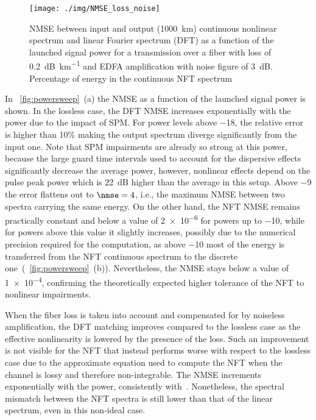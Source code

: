 \begin{figure}[t]
  \centering
   \texttt{[image: ./img/NMSE\_loss\_noise]}
      \caption{ \ac{NMSE} between input and output (\SI{1000}{km}) continuous nonlinear spectrum and linear Fourier spectrum (\ac{DFT}) as a function of the launched signal power
for a transmission over a fiber with loss of \SI{0.2}{\dB\per\km} and \ac{EDFA} amplification with noise figure of \SI{3}{\dB}.  Percentage of energy
in the continuous \ac{NFT} spectrum }
  \label{fig:powersweep_with_noise}
\end{figure}
In \figurename~\ref{fig:powersweep}~(a) the \ac{NMSE} as a function of the launched signal power
is shown. In the lossless case, the \ac{DFT} \ac{NMSE} increases exponentially with the
power due to the impact of \ac{SPM}. For power levels above
\SI{-18}{\dBm}, the relative error is higher than 10\% making the output spectrum
diverge significantly from the input one. Note that \ac{SPM} impairments are already
so strong at this power, because the large guard time intervals used to account
for the dispersive effects significantly decrease the average power, however,
nonlinear effects depend on the pulse peak power which is \SI{22}{\dB} higher than the
average in this setup. Above \SI{-9}{\dBm} the error flattens out to $\nmse = 4$, i.e., the maximum
\ac{NMSE} between two spectra carrying the same energy. On the other hand, the
\ac{NFT} \ac{NMSE} remains practically constant and below a value of \num{2e-6}
for powers up to \SI{-10}{\dBm},
while for powers above this
value it slightly increases, possibly due to the numerical precision required
for the computation, as above \SI{-10}{\dBm} most of the energy is transferred from the
\ac{NFT} continuous spectrum to the discrete
one~(\figurename~\ref{fig:powersweep}~(b)). Nevertheless, the \ac{NMSE} stays below a
value of \num{1e-4}, confirming the theoretically expected higher tolerance of the
\ac{NFT} to nonlinear impairments.

When the fiber loss is taken into account and
compensated for by noiseless amplification, the \ac{DFT} matching improves compared
to the lossless case as the effective nonlinearity is lowered by the presence of
the loss. Such an improvement is not visible for the \ac{NFT} that instead performs
worse with respect to the lossless case due to the approximate equation used to
compute the \ac{NFT} when the channel is lossy and therefore non-integrable. The
\ac{NMSE} increments exponentially with the power, consistently with~\cite{le2015nonlinear}.
Nonetheless, the spectral mismatch between the \ac{NFT} spectra is still lower
than that of the linear spectrum, even in this non-ideal case.


